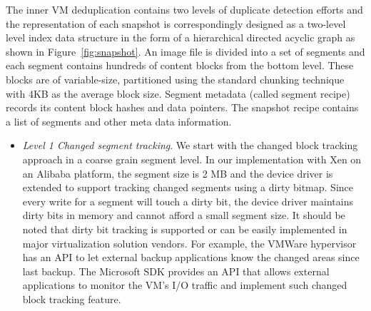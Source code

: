 The inner VM deduplication contains two levels of duplicate detection efforts and the representation of
each snapshot is correspondingly designed as a two-level level index data structure in the form of a hierarchical
directed acyclic graph as shown in Figure~\ref{fig:snapshot}.
An image file is divided into a set of segments and each  segment contains hundreds of content blocks from the bottom level.
These blocks are of variable-size, partitioned using
the standard chunking technique~\cite{similar94} with 4KB as the average block size. 
Segment metadata (called segment recipe) records its  content block hashes and data pointers. 
The snapshot recipe contains a list of segments and other meta data information.
\begin{itemize}
\item {\em Level 1 Changed segment tracking}.
We start with the changed block tracking approach in a coarse grain segment level.
In our implementation with Xen on an Alibaba platform, the segment size is 2 MB
and the device driver is extended to support tracking changed segments using a dirty bitmap. 
Since every write for a segment will touch a dirty bit, the device driver maintains dirty bits in memory
and cannot afford a small segment size.
It should be noted that dirty bit tracking is supported or can be easily implemented in 
major virtualization solution vendors. For example,
the VMWare hypervisor has an API to let external backup applications know 
the changed areas since last backup. 
The Microsoft SDK provides an API that allows external applications to monitor 
the VM's I/O traffic and implement such changed block tracking feature.


\end{itemize}
